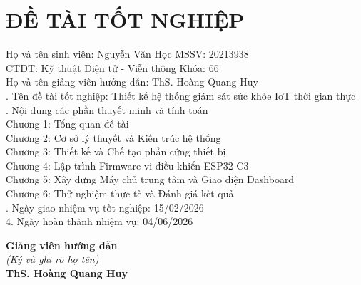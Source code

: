 \section*{ĐỀ TÀI TỐT NGHIỆP}
\thispagestyle{empty}

\noindent
Họ và tên sinh viên: Nguyễn Văn Học \hfill MSSV: 20213938 \\
CTĐT: Kỹ thuật Điện tử - Viễn thông \hfill Khóa: 66 \\[0.3cm]
Họ và tên giảng viên hướng dẫn: ThS. Hoàng Quang Huy \\

. Tên đề tài tốt nghiệp: Thiết kế hệ thống giám sát sức khỏe IoT thời gian thực \\

. Nội dung các phần thuyết minh và tính toán \\
Chương 1: Tổng quan đề tài \\
Chương 2: Cơ sở lý thuyết và Kiến trúc hệ thống \\
Chương 3: Thiết kế và Chế tạo phần cứng thiết bị \\
Chương 4: Lập trình Firmware vi điều khiển ESP32-C3 \\
Chương 5: Xây dựng Máy chủ trung tâm và Giao diện Dashboard \\
Chương 6: Thử nghiệm thực tế và Đánh giá kết quả \\

. Ngày giao nhiệm vụ tốt nghiệp: 15/02/2026 \\
4. Ngày hoàn thành nhiệm vụ: 04/06/2026 \\

\vfill
\hfill
\begin{minipage}{0.5\textwidth}
    \centering
    \textbf{Giảng viên hướng dẫn} \\
    \textit{\fontsize{10pt}{12pt}\selectfont (Ký và ghi rõ họ tên)} \\
    \vspace{2cm}
    \textbf{ThS. Hoàng Quang Huy}
\end{minipage}

\cleardoublepage

